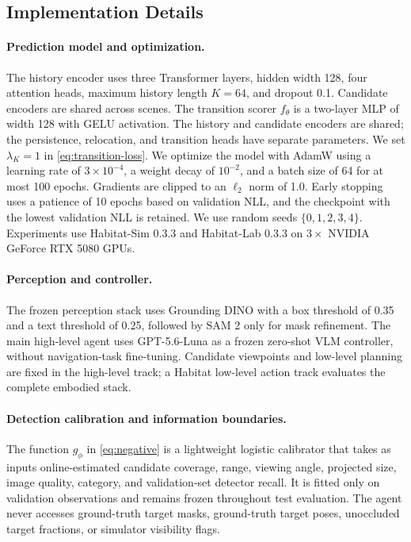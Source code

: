 \subsection{Implementation Details}
\label{app:implementation}

\paragraph{Prediction model and optimization.}
The history encoder uses three Transformer layers, hidden width 128, four
attention heads, maximum history length $K=64$, and dropout 0.1. Candidate
encoders are shared across scenes. The transition scorer $f_\theta$ is a
two-layer MLP of width 128 with GELU activation. The history and candidate
encoders are shared; the persistence, relocation, and transition heads have
separate parameters. We set $\lambda_K=1$ in \cref{eq:transition-loss}. We optimize the model with AdamW using a learning rate of
$3\times10^{-4}$, a weight decay of $10^{-2}$, and a batch size of 64 for at most 100
epochs. Gradients are clipped to an $\ell_2$ norm of 1.0. Early stopping uses
a patience of 10 epochs based on validation NLL, and the checkpoint with the lowest validation
NLL is retained. We use random seeds $\{0,1,2,3,4\}$. Experiments use Habitat-Sim
0.3.3 and Habitat-Lab 0.3.3 on $3\times$ NVIDIA GeForce RTX 5080 GPUs.

\paragraph{Perception and controller.}
The frozen perception stack uses Grounding DINO
\citep{liu2024grounding} with a box threshold of 0.35 and a text threshold of 0.25,
followed by SAM 2 \citep{ravi2025sam} only for mask refinement. The main
high-level agent uses GPT-5.6-Luna as a frozen zero-shot VLM controller, without
navigation-task fine-tuning. Candidate viewpoints and low-level planning are
fixed in the high-level track; a Habitat low-level action track evaluates the
complete embodied stack.

\paragraph{Detection calibration and information boundaries.}
The function $g_\phi$ in \cref{eq:negative} is a lightweight logistic
calibrator that takes as inputs online-estimated candidate coverage, range, viewing
angle, projected size, image quality, category, and validation-set detector
recall. It is fitted only on validation observations and remains frozen
throughout test evaluation. The agent never accesses ground-truth target masks,
ground-truth target poses, unoccluded target fractions, or simulator visibility
flags.

